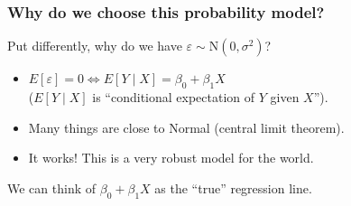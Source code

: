 \documentclass{beamer}
\newcommand{\bl}{\color{lightblue}}
\newcommand{\rd}{\color{burntorange}}
\newcommand{\bk}{\color{black}}
\newcommand{\mr}[1]{\mathrm{#1}}
\newcommand{\bi}{\begin{itemize}}
\newcommand{\ib}{\end{itemize}}
\newcommand{\p}{\item}
\newcommand{\sk}{\vspace{.5cm}}
\begin{document}
\begin{frame}
\frametitle{Why do we choose this probability model?} \vspace{-0.5cm}


Put differently, why do we have $\varepsilon \sim \mr{N}(0,\sigma^2)$?  \sk
\bi 
\p $E[\varepsilon] = 0 \Leftrightarrow E[Y \mid X] = \beta_0 +
\beta_1 X$\\
 ($E[Y \mid X] $ is \bl ``conditional expectation of $Y$
given $X$''\bk).  
\p Many things are close to Normal (central limit
theorem).  
\p It works!  This is a very robust model for the world.  
\ib

\rd
\sk We can think of $\beta_0 + \beta_1 X$ as the ``true'' regression line.

\end{frame}
\end{document}
